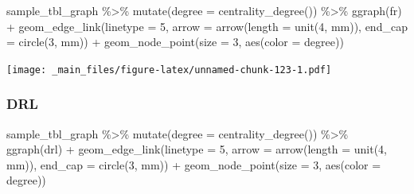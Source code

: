 \documentclass[
]{book}
\newenvironment{Shaded}{\begin{snugshade}}{\end{snugshade}}
\newcommand{\AttributeTok}[1]{\textcolor[rgb]{0.77,0.63,0.00}{#1}}
\newcommand{\DecValTok}[1]{\textcolor[rgb]{0.00,0.00,0.81}{#1}}
\newcommand{\FunctionTok}[1]{\textcolor[rgb]{0.00,0.00,0.00}{#1}}
\newcommand{\NormalTok}[1]{#1}
\newcommand{\SpecialCharTok}[1]{\textcolor[rgb]{0.00,0.00,0.00}{#1}}
\newcommand{\StringTok}[1]{\textcolor[rgb]{0.31,0.60,0.02}{#1}}
\begin{document}
\begin{Shaded}
\begin{Highlighting}[]
\NormalTok{sample\_tbl\_graph }\SpecialCharTok{\%\textgreater{}\%} 
  \FunctionTok{mutate}\NormalTok{(}\AttributeTok{degree =} \FunctionTok{centrality\_degree}\NormalTok{()) }\SpecialCharTok{\%\textgreater{}\%} 
  \FunctionTok{ggraph}\NormalTok{(}\StringTok{\textquotesingle{}fr\textquotesingle{}}\NormalTok{) }\SpecialCharTok{+} 
  \FunctionTok{geom\_edge\_link}\NormalTok{(}\AttributeTok{linetype =} \DecValTok{5}\NormalTok{,}
                 \AttributeTok{arrow =} \FunctionTok{arrow}\NormalTok{(}\AttributeTok{length =} \FunctionTok{unit}\NormalTok{(}\DecValTok{4}\NormalTok{, }\StringTok{\textquotesingle{}mm\textquotesingle{}}\NormalTok{)), }
                   \AttributeTok{end\_cap =} \FunctionTok{circle}\NormalTok{(}\DecValTok{3}\NormalTok{, }\StringTok{\textquotesingle{}mm\textquotesingle{}}\NormalTok{)) }\SpecialCharTok{+} 
  \FunctionTok{geom\_node\_point}\NormalTok{(}\AttributeTok{size =} \DecValTok{3}\NormalTok{, }\FunctionTok{aes}\NormalTok{(}\AttributeTok{color =}\NormalTok{ degree))}
\end{Highlighting}
\end{Shaded}

\texttt{[image: \_main\_files/figure-latex/unnamed-chunk-123-1.pdf]}

\hypertarget{drl}{%
\subsubsection{DRL}\label{drl}}

\begin{Shaded}
\begin{Highlighting}[]
\NormalTok{sample\_tbl\_graph }\SpecialCharTok{\%\textgreater{}\%} 
  \FunctionTok{mutate}\NormalTok{(}\AttributeTok{degree =} \FunctionTok{centrality\_degree}\NormalTok{()) }\SpecialCharTok{\%\textgreater{}\%} 
  \FunctionTok{ggraph}\NormalTok{(}\StringTok{\textquotesingle{}drl\textquotesingle{}}\NormalTok{) }\SpecialCharTok{+} 
  \FunctionTok{geom\_edge\_link}\NormalTok{(}\AttributeTok{linetype =} \DecValTok{5}\NormalTok{,}
                 \AttributeTok{arrow =} \FunctionTok{arrow}\NormalTok{(}\AttributeTok{length =} \FunctionTok{unit}\NormalTok{(}\DecValTok{4}\NormalTok{, }\StringTok{\textquotesingle{}mm\textquotesingle{}}\NormalTok{)), }
                   \AttributeTok{end\_cap =} \FunctionTok{circle}\NormalTok{(}\DecValTok{3}\NormalTok{, }\StringTok{\textquotesingle{}mm\textquotesingle{}}\NormalTok{)) }\SpecialCharTok{+} 
  \FunctionTok{geom\_node\_point}\NormalTok{(}\AttributeTok{size =} \DecValTok{3}\NormalTok{, }\FunctionTok{aes}\NormalTok{(}\AttributeTok{color =}\NormalTok{ degree))}
\end{Highlighting}
\end{Shaded}
\end{document}

